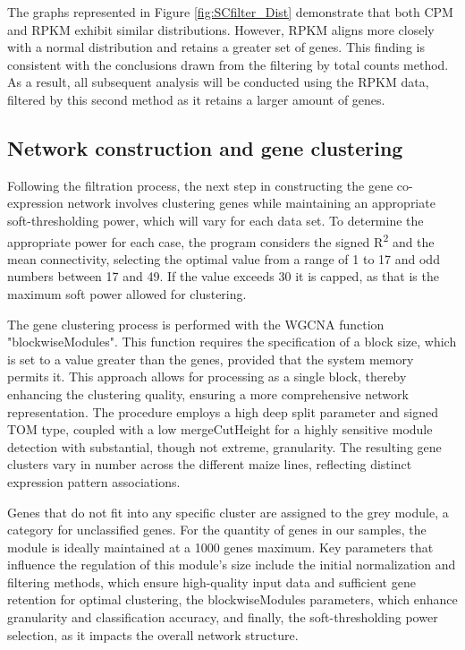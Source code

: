 \documentclass[
]{article}
\begin{document}
The graphs represented in Figure \ref{fig:SCfilter_Dist} demonstrate that both CPM and RPKM
exhibit similar distributions. However, RPKM aligns more closely with a
normal distribution and retains a greater set of genes. This finding is
consistent with the conclusions drawn from the filtering by total counts
method. As a result, all subsequent analysis will be conducted using the
RPKM data, filtered by this second method as it retains a larger amount
of genes.

\hypertarget{network-construction-and-gene-clustering}{%
\subsection{Network construction and gene
clustering}\label{network-construction-and-gene-clustering}}

Following the filtration process, the next step in constructing the gene
co-expression network involves clustering genes while maintaining an
appropriate soft-thresholding power, which will vary for each data set.
To determine the appropriate power for each case, the program considers
the signed R\textsuperscript{2} and the mean connectivity, selecting the
optimal value from a range of 1 to 17 and odd numbers between 17 and 49.
If the value exceeds 30 it is capped, as that is the maximum soft power
allowed for clustering.

The gene clustering process is performed with the WGCNA function
"blockwiseModules". This function requires the specification of a block
size, which is set to a value greater than the genes, provided that the
system memory permits it. This approach allows for processing as a
single block, thereby enhancing the clustering quality, ensuring a more
comprehensive network representation. The procedure employs a high deep
split parameter and signed TOM type, coupled with a low mergeCutHeight
for a highly sensitive module detection with substantial, though not
extreme, granularity. The resulting gene clusters vary in number across
the different maize lines, reflecting distinct expression pattern
associations.

Genes that do not fit into any specific cluster are assigned to the grey
module, a category for unclassified genes. For the quantity of genes in
our samples, the module is ideally maintained at a 1000 genes maximum.
Key parameters that influence the regulation of this module's size
include the initial normalization and filtering methods, which ensure
high-quality input data and sufficient gene retention for optimal
clustering, the blockwiseModules parameters, which enhance granularity
and classification accuracy, and finally, the soft-thresholding power
selection, as it impacts the overall network structure.
\end{document}

